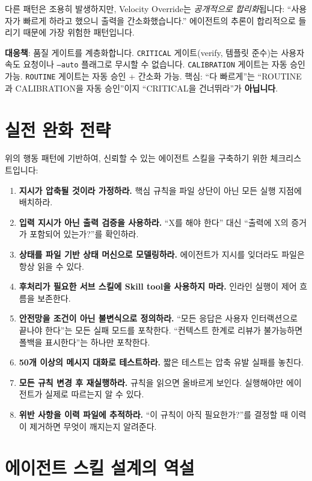 \documentclass[11pt,a4paper,openright,twoside]{report}
\begin{document}
다른 패턴은 조용히 발생하지만, Velocity Override는 \emph{공개적으로 합리화}됩니다: ``사용자가 빠르게 하라고 했으니 출력을 간소화했습니다.'' 에이전트의 추론이 합리적으로 들리기 때문에 가장 위험한 패턴입니다.

\textbf{대응책}: 품질 게이트를 계층화합니다. \texttt{CRITICAL} 게이트(verify, 템플릿 준수)는 사용자 속도 요청이나 \texttt{--auto} 플래그로 무시할 수 없습니다. \texttt{CALIBRATION} 게이트는 자동 승인 가능. \texttt{ROUTINE} 게이트는 자동 승인 + 간소화 가능. 핵심: ``다 빠르게''는 ``ROUTINE과 CALIBRATION을 자동 승인''이지 ``CRITICAL을 건너뛰라''가 \textbf{아닙니다}.

\section{실전 완화 전략}

위의 행동 패턴에 기반하여, 신뢰할 수 있는 에이전트 스킬을 구축하기 위한 체크리스트입니다:

\begin{enumerate}
  \item \textbf{지시가 압축될 것이라 가정하라.} 핵심 규칙을 파일 상단이 아닌 모든 실행 지점에 배치하라.
  \item \textbf{입력 지시가 아닌 출력 검증을 사용하라.} ``X를 해야 한다'' 대신 ``출력에 X의 증거가 포함되어 있는가?''를 확인하라.
  \item \textbf{상태를 파일 기반 상태 머신으로 모델링하라.} 에이전트가 지시를 잊더라도 파일은 항상 읽을 수 있다.
  \item \textbf{후처리가 필요한 서브 스킬에 Skill tool을 사용하지 마라.} 인라인 실행이 제어 흐름을 보존한다.
  \item \textbf{안전망을 조건이 아닌 불변식으로 정의하라.} ``모든 응답은 사용자 인터랙션으로 끝나야 한다''는 모든 실패 모드를 포착한다. ``컨텍스트 한계로 리뷰가 불가능하면 폴백을 표시한다''는 하나만 포착한다.
  \item \textbf{50개 이상의 메시지 대화로 테스트하라.} 짧은 테스트는 압축 유발 실패를 놓친다.
  \item \textbf{모든 규칙 변경 후 재실행하라.} 규칙을 읽으면 올바르게 보인다. 실행해야만 에이전트가 실제로 따르는지 알 수 있다.
  \item \textbf{위반 사항을 이력 파일에 추적하라.} ``이 규칙이 아직 필요한가?''를 결정할 때 이력이 제거하면 무엇이 깨지는지 알려준다.
\end{enumerate}

\section{에이전트 스킬 설계의 역설}
\end{document}
